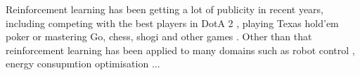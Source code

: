 


Reinforcement learning has been getting a lot of publicity in recent years, including competing with the best players in DotA 2 \cite{openai2019dota}, playing Texas hold'em poker \cite{Brown885} or mastering Go, chess, shogi and other games \cite{Schrittwieser2020}. Other than that reinforcement learning has been applied to many domains such as robot control \cite{openai2019solving}, energy consupmtion optimisation \cite{LISSA2021100043}...